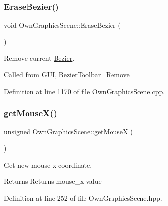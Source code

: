 \mbox{\label{classOwnGraphicsScene_a7b205ba3c4db5e88f60f1f327175b5b6}} 
\subsubsection{\texorpdfstring{Erase\+Bezier()}{EraseBezier()}}
{\footnotesize\ttfamily void Own\+Graphics\+Scene\+::\+Erase\+Bezier (\begin{DoxyParamCaption}{ }\end{DoxyParamCaption})}



Remove current \mbox{\hyperlink{classBezier}{Bezier}}. 

Called from \mbox{\hyperlink{classGUI}{G\+UI}}, Bezier\+Toolbar\+\_\+\+Remove 

Definition at line 1170 of file Own\+Graphics\+Scene.\+cpp.

\mbox{\label{classOwnGraphicsScene_a6e54bd43db758bcd4f7cc1dd4544232e}} 
\subsubsection{\texorpdfstring{get\+Mouse\+X()}{getMouseX()}}
{\footnotesize\ttfamily unsigned Own\+Graphics\+Scene\+::get\+MouseX (\begin{DoxyParamCaption}{ }\end{DoxyParamCaption})\hspace{0.3cm}{\ttfamily [inline]}}



Get new mouse x coordinate. 

\begin{DoxyReturn}{Returns}
Returns mouse\+\_\+x value 
\end{DoxyReturn}


Definition at line 252 of file Own\+Graphics\+Scene.\+hpp.

\mbox{\label{classOwnGraphicsScene_a3fd2942e9930fc2dda41844622dc8a35}} 
